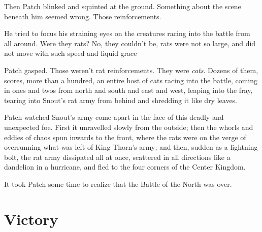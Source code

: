 \documentclass[12pt]{book}
\begin{document}
 Then Patch blinked and squinted at the ground. Something about the scene beneath him seemed wrong. Those reinforcements.\par
He tried to focus his straining eyes on the creatures racing into the battle from all around. Were they rats? No, they couldn't be, rats were not so large, and did not move with such speed and liquid grace %
\par
Patch gasped. Those weren't rat reinforcements. They were {\it cats}. Dozens of them, scores, more than a hundred, an entire host of cats racing into the battle, coming in ones and twos from north and south and east and west, leaping into the fray, tearing into Snout's rat army from behind and shredding it like dry leaves.\par
Patch watched Snout's army come apart in the face of this deadly and unexpected foe. First it unravelled slowly from the outside; then the whorls and eddies of chaos spun inwards to the front, where the rats were on the verge of overrunning what was left of King Thorn's army; and then, sudden as a lightning bolt, the rat army dissipated all at once, scattered in all directions like a dandelion in a hurricane, and fled to the four corners of the Center Kingdom.\par
It took Patch some time to realize that the Battle of the North was over.\par

\section{Victory}
\end{document}
